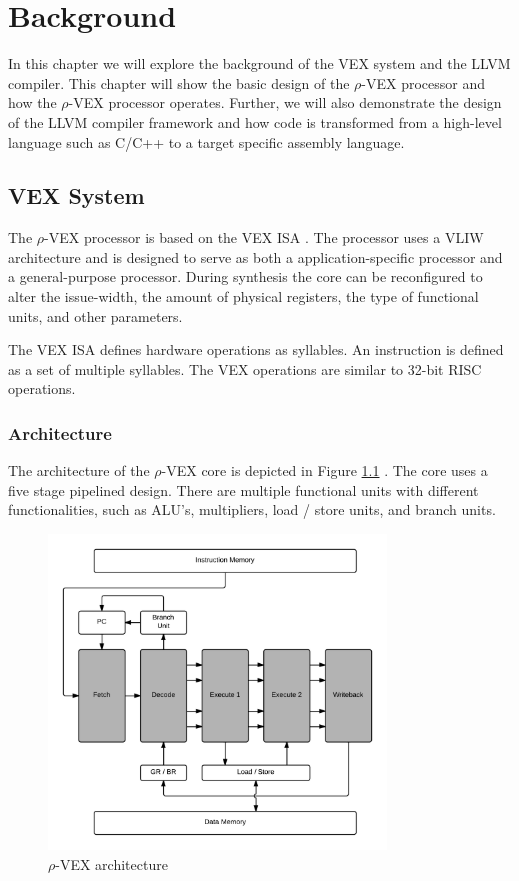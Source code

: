 \chapter{Background}
\label{chap:background}
In this chapter we will explore the background of the VEX system and the LLVM compiler. This chapter will show the basic design of the $\rho$-VEX processor and how the $\rho$-VEX processor operates. Further, we will also demonstrate the design of the LLVM compiler framework and how code is transformed from a high-level language such as C/C++ to a target specific assembly language.

\section{VEX System}
The $\rho$-VEX processor is based on the VEX ISA \cite{As:2008rt}. The processor uses a VLIW architecture and is designed to serve as both a application-specific processor and a general-purpose processor. During synthesis the core can be reconfigured to alter the issue-width, the amount of physical registers, the type of functional units, and other parameters.

The VEX ISA defines hardware operations as syllables. An instruction is defined as a set of multiple syllables. The VEX operations are similar to 32-bit RISC operations.

\subsection{Architecture}
The architecture of the $\rho$-VEX core is depicted in Figure \ref{fig:rvex_arch} \cite{Seedorf:2011fj}. The core uses a five stage pipelined design. There are multiple functional units with different functionalities, such as ALU’s, multipliers, load / store units, and branch units.

\begin{figure}[ht]
\centering
\includegraphics[width=0.8\textwidth]{2_background/img/rvex_arch.png}
\caption{$\rho$-VEX architecture}
\label{fig:rvex_arch}
\end{figure}


